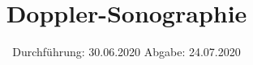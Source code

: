 

\subject{US3}
\title{Doppler-Sonographie}
\date{%
  Durchführung: 30.06.2020
  \hspace{3em}
  Abgabe: 24.07.2020
}



\maketitle
\thispagestyle{empty}
\tableofcontents
\newpage








\printbibliography{}


